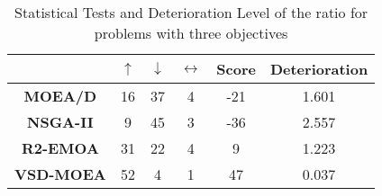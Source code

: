 \begin{table}[t]
\caption{Statistical Tests and Deterioration Level of the \HV{} ratio for problems with three objectives}
\label{tab:Tests_HV_3obj}
\centering
\begin{scriptsize}
\begin{tabular}{c c|c|c|c|c}
\cline{2-6}
                                        & \textbf{$\uparrow$} & \textbf{$\downarrow$} & \textbf{$\leftrightarrow$} & \textbf{Score}& \textbf{Deterioration} \\ \hline
\multicolumn{1}{c|}{\textbf{MOEA/D}}   & 16                  & 37                     & 4                          & -21                          & 1.601         \\ \hline
\multicolumn{1}{c|}{\textbf{NSGA-II}}  & 9                   & 45                     & 3                          & -36                          & 2.557         \\ \hline
\multicolumn{1}{c|}{\textbf{R2-EMOA}}  & 31                  & 22                     & 4                          & 9                          & 1.223         \\ \hline
\multicolumn{1}{c|}{\textbf{VSD-MOEA}} & 52                  & 4                      & 1                          & 47                          & 0.037         \\ \hline
\end{tabular}%
\end{scriptsize}
\end{table}

%
